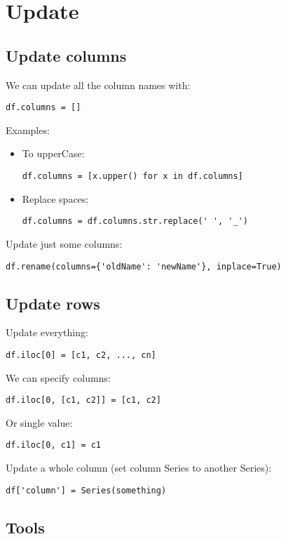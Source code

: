 \documentclass[french]{article}
\begin{document}
\section{Update}

\subsection{Update columns}
We can update all the column names with:
\begin{verbatim}
df.columns = []
\end{verbatim}

Examples:
\begin{itemize}
\item To upperCase:
\begin{verbatim}
df.columns = [x.upper() for x in df.columns]
\end{verbatim}

\item Replace spaces:
\begin{verbatim}
df.columns = df.columns.str.replace(' ', '_')
\end{verbatim}
\end{itemize}

Update just some columns:
\begin{verbatim}
df.rename(columns={'oldName': 'newName'}, inplace=True)
\end{verbatim}

\subsection{Update rows}

Update everything:
\begin{verbatim}
df.iloc[0] = [c1, c2, ..., cn]
\end{verbatim}

We can specify columns:
\begin{verbatim}
df.iloc[0, [c1, c2]] = [c1, c2]
\end{verbatim}

Or single value:
\begin{verbatim}
df.iloc[0, c1] = c1
\end{verbatim}

Update a whole column (set column Series to another Series):
\begin{verbatim}
df['column'] = Series(something)
\end{verbatim}

\subsection{Tools}
\end{document}
